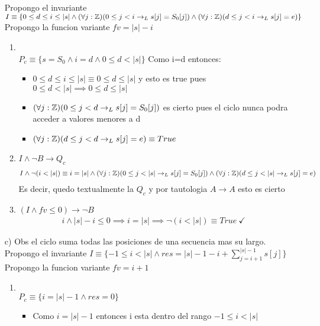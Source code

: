 \documentclass{article}
\begin{document}
\begin{itemize}
    Propongo el invariante $I\equiv\{0\leq d \leq i\leq|s|\land (\forall j:\mathbb{Z})(0\leq j<i\to_L s[j]=S_0[j])\land (\forall j:\mathbb{Z})(d\leq j<i\to_L s[j]=e)\}$\\
    Propongo la funcion variante $fv=|s|-i$
    \begin{enumerate}
        \item \tuno\\
        $P_c\equiv\{s=S_0\land i=d \land 0\leq d<|s|\}$
        Como i=d entonces: 
        \begin{itemize}
            \item $0\leq d \leq i\leq|s|\equiv 0\leq d \leq|s|$ y esto es true pues $0\leq d<|s|\implies 0\leq d \leq|s|$
            \item $(\forall j:\mathbb{Z})(0\leq j<d\to_L s[j]=S_0[j])$ es cierto pues el ciclo nunca
            podra acceder a valores menores a d
            \item $(\forall j:\mathbb{Z})(d\leq j<d\to_L s[j]=e)\equiv True$
        \end{itemize}
        \item $I\land\neg B\to Q_c$
        \cont\begin{align}
            I\land \neg(i<|s|)\equiv i=|s| \land (\forall j:\entero)(0\leq j<|s|\to_L s[j]=S_0[j])\land (\forall j:\entero)(d\leq j<|s|\to_L s[j]=e)
        \end{align}
        Es decir, quedo textualmente la $Q_c$ y por tautologia $A\to A$ esto es cierto
        \item $(I\land fv\leq0)\to\neg B$
        \cont\begin{align}
            i\land |s|-i\leq0\implies i=|s| \implies \neg (i<|s|) \equiv True\ \checkmark
        \end{align}
    \end{enumerate}
    \item [c) ] Obs el ciclo suma todas las posiciones de una secuencia mas su largo.\\
    Propongo el invariante $I\equiv\{-1\leq i <|s| \land res=|s|-1-i+\sum\limits_{j=i+1}^{|s|-1}s[j]\}$\\
    Propongo la funcion variante $fv=i+1$
    \begin{enumerate}
        \item \tuno\\
        $P_c\equiv\{i=|s|-1\land res=0\}$
        \begin{itemize}
            \item Como $i=|s|-1$ entonces i esta dentro del rango $-1\leq i<|s|$

\end{itemize}
\end{enumerate}
\end{itemize}
\end{document}

